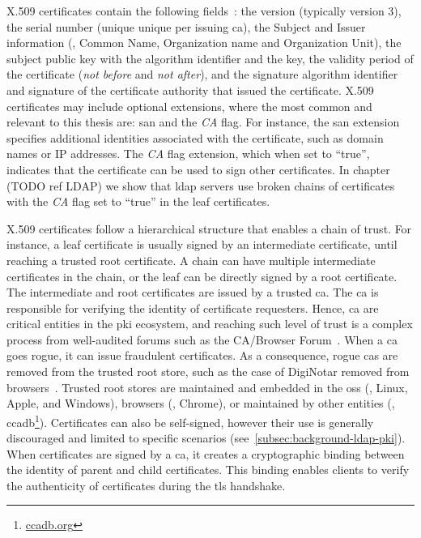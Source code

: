 X.509 certificates contain the following fields~\cite{itu-t-x509}: the version (typically version 3), the serial number (unique unique per issuing \gls{ca}), the Subject and Issuer information (\eg, Common Name, Organization name and Organization Unit), the subject public key with the algorithm identifier and the key, the validity period of the certificate (\textit{not before} and \textit{not after}), and the signature algorithm identifier and signature of the certificate authority that issued the certificate.
X.509 certificates may include optional extensions, where the most common and relevant to this thesis are: \gls{san} and the \textit{CA} flag.
For instance, the \gls{san} extension specifies additional identities associated with the certificate, such as domain names or IP addresses.
The \textit{CA} flag extension, which when set to ``true'', indicates that the certificate can be used to sign other certificates.
In chapter (TODO ref LDAP) we show that \gls{ldap} servers use broken chains of certificates with the \textit{CA} flag set to ``true'' in the leaf certificates.

X.509 certificates follow a hierarchical structure that enables a chain of trust.
For instance, a leaf certificate is usually signed by an intermediate certificate, until reaching a trusted root certificate.
A chain can have multiple intermediate certificates in the chain, or the leaf can be directly signed by a root certificate.
The intermediate and root certificates are issued by a trusted \gls{ca}.
The \gls{ca} is responsible for verifying the identity of certificate requesters.
Hence, \gls{ca} are critical entities in the \gls{pki} ecosystem, and reaching such level of trust is a complex process from well-audited forums such as the CA/Browser Forum~\cite{cabr}.
When a \gls{ca} goes rogue, it can issue fraudulent certificates.
As a consequence, rogue \glspl{ca} are removed from the trusted root store, such as the case of DigiNotar removed from browsers~\cite{NightingaleDigiNotarRemovalFollow2011}.
Trusted root stores are maintained and embedded in the \glspl{os} (\eg, Linux, Apple, and Windows), browsers (\eg, Chrome), or maintained by other entities (\eg, \gls{ccadb}\footnote{\url{ccadb.org}}).
Certificates can also be self-signed, however their use is generally discouraged and limited to specific scenarios (see~\cref{subsec:background-ldap-pki}).
When certificates are signed by a \gls{ca}, it creates a cryptographic binding between the identity of parent and child certificates.
This binding enables clients to verify the authenticity of certificates during the \gls{tls} handshake.

